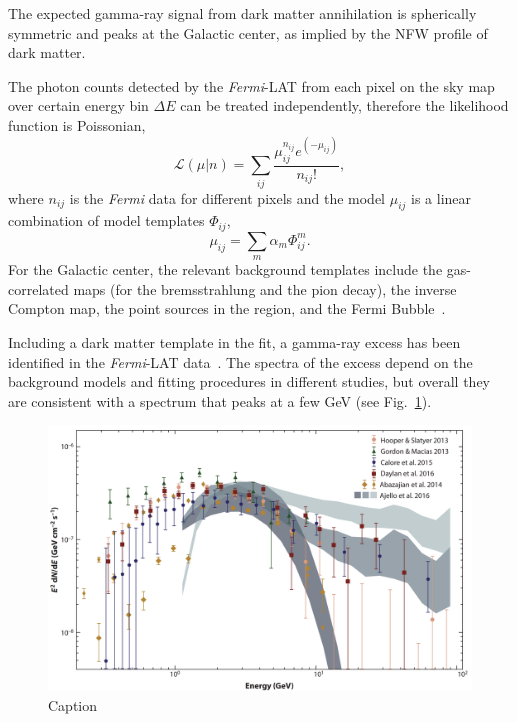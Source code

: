 \documentclass[doublespace,nopageskip]{VTthesis} %
\begin{document}
The expected gamma-ray signal from dark matter annihilation is spherically symmetric and peaks at the Galactic center, as implied by the NFW profile of dark matter.

The photon counts detected by the \textit{Fermi}-LAT from each pixel on the sky map over certain energy bin $\Delta E$ can be treated independently, therefore the likelihood function is Poissonian,
\begin{equation}
    \mathcal{L}(\mu|n)= \sum_{ij}\frac{\mu_{ij}^{n_{ij}}e^{(-\mu_{ij})}}{n_{ij}!},
\end{equation}
where $n_{ij}$ is the \textit{Fermi} data for different pixels and the model $\mu_{ij}$ is a linear combination of model templates $\Phi_{ij}$,
\begin{equation}
    \mu_{ij} = \sum_m \alpha_m \Phi^m_{ij}.
\end{equation}
For the Galactic center, the relevant background templates include the gas-correlated maps (for the bremsstrahlung and the pion decay), the inverse Compton map, the point sources in the region, and the Fermi Bubble~\cite{2010ApJ...724.1044S}.

Including a dark matter template in the fit, a gamma-ray excess has been identified in the \textit{Fermi}-LAT data~\cite{2009arXiv0910.2998G, 2009arXiv0912.3828V,2011PhLB..697..412H,2012PhRvD..86h3511A,2013PhRvD..88h3521G,2014PhRvD..89f3515M,2013PDU.....2..118H,2014PhRvD..90b3526A,2016PDU....12....1D,2015JCAP...03..038C,2015PhRvD..91l3010Z,2016ApJ...819...44A,2017ApJ...840...43A}. The spectra of the excess depend on the background models and fitting procedures in different studies, but overall they are consistent with a spectrum that peaks at a few GeV (see Fig.~\ref{fig:gce_spectra}).
\begin{figure}[htb]
    \centering
    \includegraphics[width=\textwidth]{Figures/Intro/gcespectrum.png}
    \caption{Caption}
    \label{fig:gce_spectra}
\end{figure}
\end{document}
